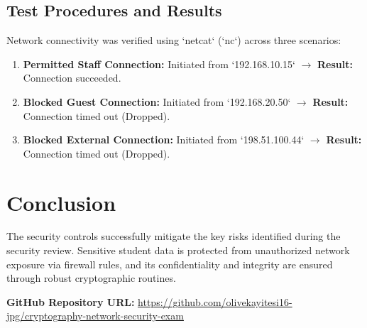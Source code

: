 \documentclass[11pt,a4paper]{article}
\begin{document}
\subsection{Test Procedures and Results}
Network connectivity was verified using `netcat` (`nc`) across three scenarios:
\begin{enumerate}
    \item \textbf{Permitted Staff Connection:} Initiated from `192.168.10.15` $\rightarrow$ \textbf{Result:} Connection succeeded.
    \item \textbf{Blocked Guest Connection:} Initiated from `192.168.20.50` $\rightarrow$ \textbf{Result:} Connection timed out (Dropped).
    \item \textbf{Blocked External Connection:} Initiated from `198.51.100.44` $\rightarrow$ \textbf{Result:} Connection timed out (Dropped).
\end{enumerate}

\section{Conclusion}
The security controls successfully mitigate the key risks identified during the security review. Sensitive student data is protected from unauthorized network exposure via firewall rules, and its confidentiality and integrity are ensured through robust cryptographic routines.

\vspace{0.5cm}
\noindent\textbf{GitHub Repository URL:} \url{https://github.com/olivekayitesi16-jpg/cryptography-network-security-exam}
\end{document}
